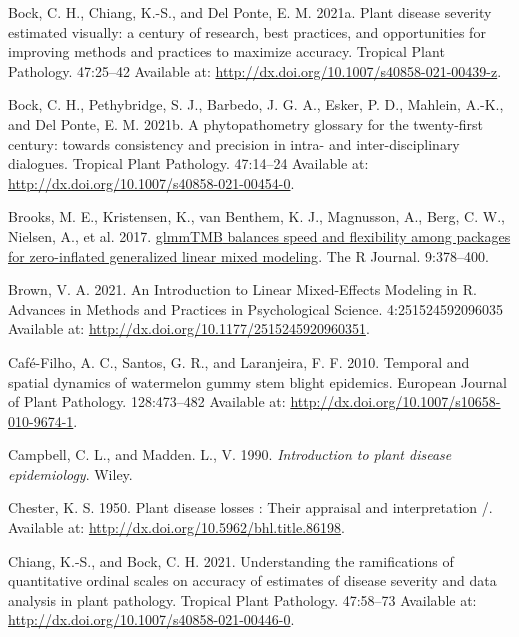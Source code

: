 \documentclass[
  letterpaper,
]{book}
\newlength{\cslhangindent}
\newlength{\cslentryspacingunit} %
\newenvironment{CSLReferences}[2] %
 {%
  \setlength{\parindent}{0pt}
  \ifodd #1
  \let\oldpar\par
  \def\par{\hangindent=\cslhangindent\oldpar}
  \fi
  \setlength{\parskip}{#2\cslentryspacingunit}
 }%
 {}
\begin{document}
\begin{CSLReferences}{0}{0}
\leavevmode{}%
Bock, C. H., Chiang, K.-S., and Del Ponte, E. M. 2021a. Plant disease
severity estimated visually: a century of research, best practices, and
opportunities for improving methods and practices to maximize accuracy.
Tropical Plant Pathology. 47:25--42 Available at:
\url{http://dx.doi.org/10.1007/s40858-021-00439-z}.

\leavevmode{}%
Bock, C. H., Pethybridge, S. J., Barbedo, J. G. A., Esker, P. D.,
Mahlein, A.-K., and Del Ponte, E. M. 2021b. A phytopathometry glossary
for the twenty-first century: towards consistency and precision in
intra- and inter-disciplinary dialogues. Tropical Plant Pathology.
47:14--24 Available at:
\url{http://dx.doi.org/10.1007/s40858-021-00454-0}.

\leavevmode{}%
Brooks, M. E., Kristensen, K., van Benthem, K. J., Magnusson, A., Berg,
C. W., Nielsen, A., et al. 2017.
\href{https://doi.org/10.32614/RJ-2017-066}{{glmmTMB} balances speed and
flexibility among packages for zero-inflated generalized linear mixed
modeling}. The R Journal. 9:378--400.

\leavevmode{}%
Brown, V. A. 2021. An Introduction to Linear Mixed-Effects Modeling in
R. Advances in Methods and Practices in Psychological Science.
4:251524592096035 Available at:
\url{http://dx.doi.org/10.1177/2515245920960351}.

\leavevmode{}%
Café-Filho, A. C., Santos, G. R., and Laranjeira, F. F. 2010. Temporal
and spatial dynamics of watermelon gummy stem blight epidemics. European
Journal of Plant Pathology. 128:473--482 Available at:
\url{http://dx.doi.org/10.1007/s10658-010-9674-1}.

\leavevmode{}%
Campbell, C. L., and Madden. L., V. 1990. \emph{Introduction to plant
disease epidemiology}. Wiley.

\leavevmode{}%
Chester, K. S. 1950. Plant disease losses : Their appraisal and
interpretation /. Available at:
\url{http://dx.doi.org/10.5962/bhl.title.86198}.

\leavevmode{}%
Chiang, K.-S., and Bock, C. H. 2021. Understanding the ramifications of
quantitative ordinal scales on accuracy of estimates of disease severity
and data analysis in plant pathology. Tropical Plant Pathology.
47:58--73 Available at:
\url{http://dx.doi.org/10.1007/s40858-021-00446-0}.


\end{CSLReferences}
\end{document}
